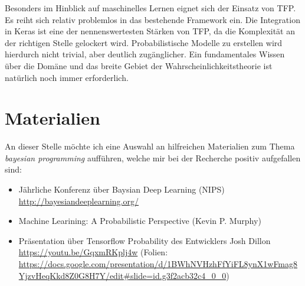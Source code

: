 \documentclass[12pt]{article}
\begin{document}
Besonders im Hinblick auf maschinelles Lernen eignet sich der Einsatz von TFP. Es reiht sich relativ problemlos in das bestehende Framework ein. Die Integration in Keras ist eine der nennenswertesten Stärken von TFP, da die Komplexität an der richtigen Stelle gelockert wird. Probabilistische Modelle zu erstellen wird hierdurch nicht trivial, aber deutlich zugänglicher. Ein fundamentales Wissen über die Domäne und das breite Gebiet der Wahrscheinlichkeitstheorie ist natürlich noch immer erforderlich. 

\section{Materialien}

An dieser Stelle möchte ich eine Auswahl an hilfreichen Materialien zum Thema \textit{bayesian programming} aufführen, welche mir bei der Recherche positiv aufgefallen sind:
\begin{itemize}
  \item Jährliche Konferenz über Baysian Deep Learning (NIPS) \url{http://bayesiandeeplearning.org/}
  \item Machine Learining: A Probabilistic Perspective (Kevin P. Murphy)\cite{Murphy2012}
  \item Präsentation über Tensorflow Probability des Entwicklers Josh Dillon \url{https://youtu.be/GqxmRKplj4w} (Folien: \url{https://docs.google.com/presentation/d/1BWhNVHzhFfYiFL8ynX1wFmag8YjzvHeqKkd8Z0G8H7Y/edit#slide=id.g3f2acb32c4_0_0})
\end{itemize}


\newpage



\listoffigures
\lstlistoflistings
\end{document}
